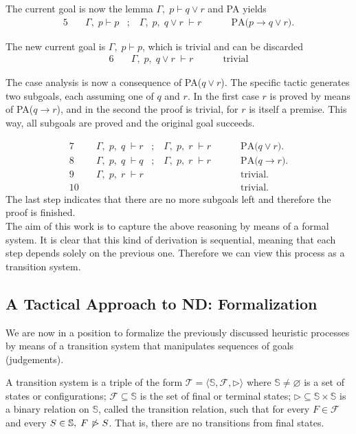 \documentclass[a4paper,UKenglish]{lipics}
\newcommand{\G}{\Gamma}
\begin{document}
\noindent The current goal is now the lemma $\G,\;p\vdash q\lor r$ and PA yields
\[ \begin{array}{rll}
5 \quad & \G,\;p \vdash p \;\;\; ;\;\;\; \G,\;p,\;q\lor r\;\vdash r\; & \qquad  \mbox{PA(} p\to q\lor r \mbox{).} 
\end{array} \]

\noindent The new current goal is $\G,\;p\vdash p$, which is trivial and can be discarded
\[ \begin{array}{rll}
6 \quad & \G,\;p,\;q\lor r\;\vdash r\;  & \qquad  \mbox{trivial}
\end{array} \]

\noindent The case analysis is now a consequence of PA($q\lor r$). The specific tactic generates two subgoals, each assuming one of $q$ and $r$. In the first case $r$ is proved by means of PA($q\to r$), and in the second the proof is trivial, for $r$ is itself a premise. This way, all subgoals are proved and the original goal succeeds.

\[ \begin{array}{rll}
7 \quad & \G,\;p,\;q\;\vdash r \;\;\; ;  \;\;\;\G,\;p,\;r\;\vdash r\; & \qquad \mbox{PA(} q\lor r\mbox{).} \\
8 \quad & \G,\;p,\;q\;\vdash q \;\;\; ;  \;\;\;\G,\;p,\;r\;\vdash r\;  & \qquad \mbox{PA(} q\to r \mbox{).} \\ 
9 \quad & \G,\;p,\;r\;\vdash r\;  & \qquad \mbox{trivial.} \\
10 \quad & & \qquad \mbox{trivial.}
\end{array}\]
The last step indicates that there are no more subgoals left and therefore the proof is finished. \\

\noindent The aim of this work is to capture the above reasoning by means of a formal system. It is clear that this kind of derivation is sequential, meaning that each step depends solely on the previous one. Therefore we can view this process as a transition system. 




\subsection{A Tactical Approach to ND: Formalization}

We are now in a position to formalize the previously discussed heuristic processes by means of a transition system that manipulates sequences of goals (judgements).

\begin{definition}
  A  transition system is a triple of the form $\mathcal{T}=\langle \mathbb{S},\mathcal{F},\rhd\rangle$ where $\mathbb{S}\neq\varnothing$ is a set of states or configurations; $\mathcal{F}\subseteq\mathbb{S}$ is the set of final or terminal states; $\rhd\subseteq \mathbb{S}\times\mathbb{S}$ is a binary relation on $\mathbb{S}$, called the transition relation, such that for every $F\in\mathcal{F}$ and every $S\in\mathbb{S},\; F\not\!\rhd\; S$. That is, there are no transitions from final states. 
\end{definition}
\end{document}
